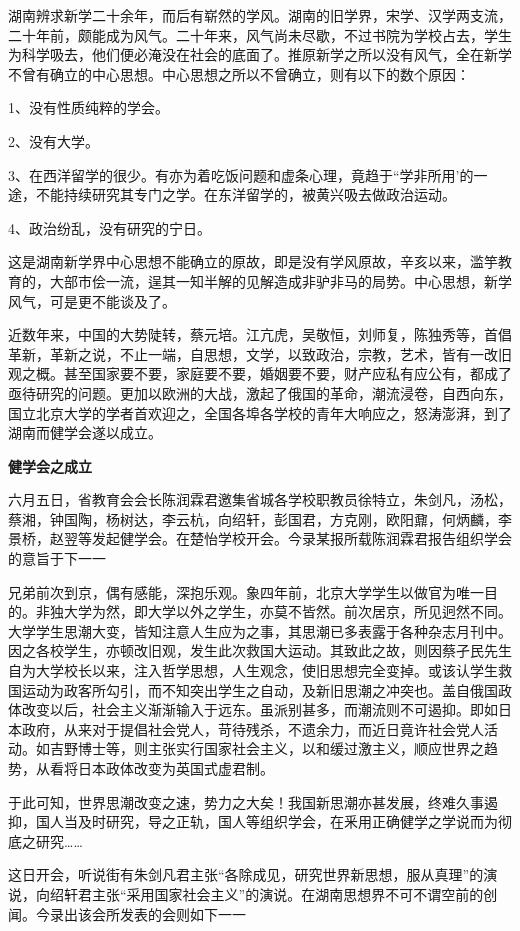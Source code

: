 湖南辨求新学二十余年，而后有崭然的学风。湖南的旧学界，宋学、汉学两支流，二十年前，颇能成为风气。二十年来，风气尚未尽歇，不过书院为学校占去，学生为科学吸去，他们便必淹没在社会的底面了。推原新学之所以没有风气，全在新学不曾有确立的中心思想。中心思想之所以不曾确立，则有以下的数个原因：

1、没有性质纯粹的学会。

2、没有大学。

3、在西洋留学的很少。有亦为着吃饭问题和虚条心理，竟趋于“学非所用’的一途，不能持续研究其专门之学。在东洋留学的，被黄兴吸去做政治运动。

4、政治纷乱，没有研究的宁日。

这是湖南新学界中心思想不能确立的原故，即是没有学风原故，辛亥以来，滥竽教育的，大部市侩一流，逞其一知半解的见解造成非驴非马的局势。中心思想，新学风气，可是更不能谈及了。

近数年来，中国的大势陡转，蔡元培。江亢虎，吴敬恒，刘师复，陈独秀等，首倡革新，革新之说，不止一端，自思想，文学，以致政治，宗教，艺术，皆有一改旧观之概。甚至国家要不要，家庭要不要，婚姻要不要，财产应私有应公有，都成了亟待研究的问题。更加以欧洲的大战，激起了俄国的革命，潮流浸卷，自西向东，国立北京大学的学者首欢迎之，全国各埠各学校的青年大响应之，怒涛澎湃，到了湖南而健学会遂以成立。

\textbf{健学会之成立}

六月五日，省教育会会长陈润霖君邀集省城各学校职教员徐特立，朱剑凡，汤松，蔡湘，钟国陶，杨树达，李云杭，向绍轩，彭国君，方克刚，欧阳鼐，何炳麟，李景桥，赵翌等发起健学会。在楚怡学校开会。今录某报所载陈润霖君报告组织学会的意旨于下一一

兄弟前次到京，偶有感能，深抱乐观。象四年前，北京大学学生以做官为唯一目的。非独大学为然，即大学以外之学生，亦莫不皆然。前次居京，所见迥然不同。大学学生思潮大变，皆知注意人生应为之事，其思潮已多表露于各种杂志月刊中。因之各校学生，亦顿改旧观，发生此次救国大运动。其致此之故，则因蔡孑民先生自为大学校长以来，注入哲学思想，人生观念，使旧思想完全变掉。或该认学生救国运动为政客所勾引，而不知突出学生之自动，及新旧思潮之冲突也。盖自俄国政体改变以后，社会主义渐渐输入于远东。虽派别甚多，而潮流则不可遏抑。即如日本政府，从来对于提倡社会党人，苛待残杀，不遗余力，而近日竟许社会党人活动。如吉野博士等，则主张实行国家社会主义，以和缓过激主义，顺应世界之趋势，从看将日本政体改变为英国式虚君制。

于此可知，世界思潮改变之速，势力之大矣！我国新思潮亦甚发展，终难久事遏抑，国人当及时研究，导之正轨，国人等组织学会，在釆用正确健学之学说而为彻底之研究……

这日开会，听说街有朱剑凡君主张“各除成见，研究世界新思想，服从真理”的演说，向绍轩君主张“采用国家社会主义”的演说。在湖南思想界不可不谓空前的创闻。今录出该会所发表的会则如下一一

